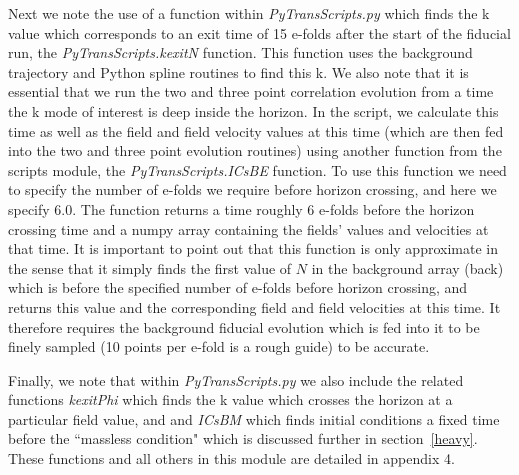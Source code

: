 \documentclass[10pt,
amsmath,amssymb,
aps,prd,nofootinbib,eqsecnum,a4paper]{revtex4}
\begin{document}
Next we note the use of a function within {\it PyTransScripts.py} which 
finds the k value which corresponds to an exit time of 15 e-folds after the start of the fiducial run, the {\it PyTransScripts.kexitN} 
function. This function 
uses the background trajectory and Python spline routines to find this k.
We also note that it is essential that we run the two and three point correlation evolution 
from a time the k mode of interest is deep inside the horizon. In the script, we calculate this time 
as well as the field and field velocity values at this time 
(which are then fed into the two and three point evolution routines) using another function from the 
scripts module, the {\it PyTransScripts.ICsBE} function. 
To use this function we need to specify the number of e-folds we require before horizon crossing, and here we specify $6.0$. The function returns a time roughly 6 e-folds before the horizon crossing time and a numpy array containing the fields' values and velocities at that time. 
It is important to point out that this function is only approximate in the sense that it 
simply finds the first value of $N$ in the background array (back) 
which is before the specified number of e-folds before horizon 
crossing, and returns this value and the corresponding field and field velocities at this time. 
It therefore requires 
the background fiducial evolution which is fed into it to be finely sampled 
(10 points per e-fold is a rough guide) to be accurate.

Finally, we note 
that within {\it PyTransScripts.py} we also include the related functions  {\it kexitPhi} which finds the k value which 
crosses the horizon at a particular field value, and and {\it ICsBM} which finds initial conditions a 
fixed time before the ``massless condition" which is discussed further in section~\ref{heavy}.  These functions 
and all others in this module are detailed in appendix 4.
\end{document}
